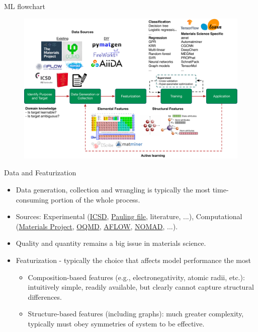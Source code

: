 \documentclass[aspectratio=169]{beamer}
\begin{document}
\begin{frame}{ML flowchart}
\begin{figure}
    \centering
    \includegraphics[width=\textwidth]{figures/ml_flowchart.pdf}
\end{figure}
\end{frame}


\begin{frame}{Data and Featurization}
    \begin{itemize}
        \item Data generation, collection and wrangling is typically the most time-consuming portion of the whole process.
        \item Sources: Experimental (\href{http://icsd.fiz-karlsruhe.de/icsd/}{ICSD}, \href{http://paulingfile.com/}{Pauling file}, literature, ...), Computational (\href{http://www.materialsproject.org}{Materials Project}, \href{http://oqmd.org/}{OQMD}, \href{http://aflowlib.org/}{AFLOW}, \href{https://nomad-coe.eu/}{NOMAD}, ...).
        \item Quality and quantity remains a big issue in materials science.
        \item Featurization - typically the choice that affects model performance the most
        \begin{itemize}
            \item Composition-based features (e.g., electronegativity, atomic radii, etc.): intuitively simple, readily available, but clearly cannot capture structural differences.
            \item Structure-based features (including graphs): much greater complexity, typically must obey symmetries of system to be effective.
        \end{itemize}
    \end{itemize}
\end{frame}
\end{document}
